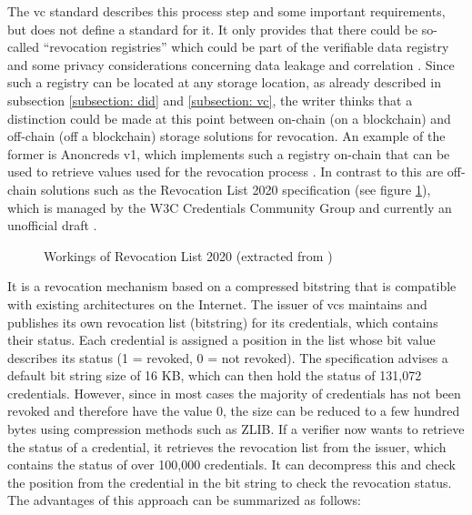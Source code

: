 		The \ac{vc} standard describes this process step and some important requirements, but does not define a standard for it. It only provides that there could be so-called “revocation registries” which could be part of the verifiable data registry and some privacy considerations concerning data leakage and correlation  \cite{sporny_verifiable_2019}.
		Since such a registry can be located at any storage location, as already described in subsection \ref{subsection: did} and \ref{subsection: vc}, the writer thinks that a distinction could be made at this point between on-chain (on a blockchain) and off-chain (off a blockchain) storage solutions for revocation. An example of the former is Anoncreds v1, which implements such a registry on-chain that can be used to retrieve values used for the revocation process \cite{hardman_0011_2018, hyperledger_how_2018}. In contrast to this are off-chain solutions such as the Revocation List 2020 specification (see figure \ref{figure: revocationlist2020}), which is managed by the W3C Credentials Community Group and currently an unofficial draft \cite{longley_revocation_2021}.
		
	    \begin{figure}[htp]
    	    \centering
    	    \makebox[\textwidth]{}
            \caption{Workings of Revocation List 2020 (extracted from \cite{longley_revocation_2021})}
            \label{figure: revocationlist2020}
        \end{figure}
        
        It is a revocation mechanism based on a compressed bitstring that is compatible with existing architectures on the Internet. The issuer of \acp{vc} maintains and publishes its own revocation list (bitstring) for its credentials, which contains their status. Each credential is assigned a position in the list whose bit value describes its status (1 = revoked, 0 = not revoked). The specification advises a default bit string size of 16 KB, which can then hold the status of 131,072 credentials. However, since in most cases the majority of credentials has not been revoked and therefore have the value 0, the size can be reduced to a few hundred bytes using compression methods such as ZLIB. If a verifier now wants to retrieve the status of a credential, it retrieves the revocation list from the issuer, which contains the status of over 100,000 credentials. It can decompress this and check the position from the credential in the bit string to check the revocation status. The advantages of this approach can be summarized as follows: \cite{longley_revocation_2021}
        
